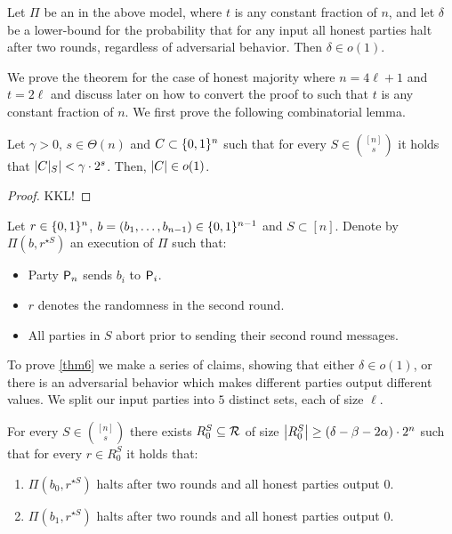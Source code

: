 \begin{theorem}\label{thm6}
	Let $\Pi$ be an  in the above model, where $t$ is any constant fraction of $n$, and let $\delta$ be a lower-bound for the probability that for any input all honest parties halt after two rounds, regardless of adversarial behavior. Then $\delta \in o(1)$.
\end{theorem}

We prove the theorem for the case of honest majority where $n = 4\ell + 1$ and $t = 2\ell$ and discuss later on how to convert the proof to such that $t$ is any constant fraction of $n$. We first prove the following combinatorial lemma. 

\begin{lemma}\label{lemma6}
	Let $\gamma > 0$, $s \in \Theta(n)$ and $C \subset \{0,1\}^n$ such that for every $S \in {\binom{[n]}{s}}$ it holds that $\left|C|_{S}\right| < \gamma \cdot 2^s$. Then, $\left|C\right| \in o(1)$.  
\end{lemma}

\begin{proof}
	KKL!
\end{proof}

\begin{definition}
	Let $r \in \{0,1\}^n$, $b = (b_1,\dots, b_{n-1}) \in \{0,1\}^{n-1}$ and $S \subset [n]$. Denote by $\Pi(b,r^{\star S})$ an execution of $\Pi$ such that:
	\begin{itemize}
		\item Party $\mathsf{P}_n$ sends $b_i$ to $\mathsf{P}_i$.
		\item $r$ denotes the randomness in the second round.
		\item All parties in $S$ abort prior to sending their second round messages.
	\end{itemize} 
\end{definition}

To prove \cref{thm6} we make a series of claims, showing that either $\delta \in o(1)$, or there is an adversarial behavior which makes different parties output different values. We split our input parties into $5$ distinct sets, each of size $\ell$. 
\begin{claim}\label{clm6.1}
For every $S \in \binom{[n]}{s}$ there exists $R^S_0 \subseteq \mathcal{R}$ of size $\left\lvert R^S_0 \right\rvert \geq (\delta-\beta-2\alpha) \cdot 2^{n}$ such that for every $r \in R^S_0$ it holds that:
\begin{enumerate}
	\item $\Pi(b_0,r^{\star S})$ halts after two rounds and all honest parties output $0$.
	\item $\Pi(b_1,r^{\star S})$ halts after two rounds and all honest parties output $0$.
\end{enumerate}
\end{claim}

